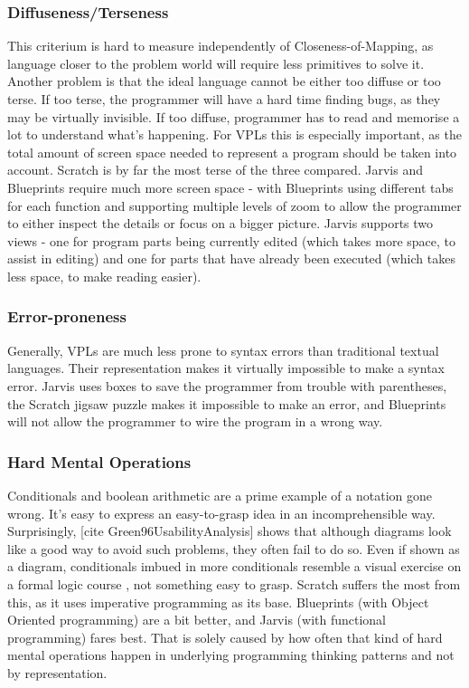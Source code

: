 \documentclass[11pt]{scrartcl}
\begin{document}
\subsubsection{Diffuseness/Terseness}
This criterium is hard to measure independently of Closeness-of-Mapping, as language closer to the problem world will require less primitives to solve it. Another problem is that the ideal language cannot be either too diffuse or too terse. If too terse, the programmer will have a hard time finding bugs, as they may be virtually invisible. If too diffuse, programmer has to read and memorise a lot to understand what’s happening. For VPLs this is especially important, as the total amount of screen space needed to represent a program should be taken into account. Scratch is by far the most terse of the three compared. Jarvis and Blueprints require much more screen space - with Blueprints using different tabs for each function and supporting multiple levels of zoom to allow the programmer to either inspect the details or focus on a bigger picture. Jarvis supports two views - one for program parts being currently edited (which takes more space, to assist in editing) and one for parts that have already been executed (which takes less space, to make reading easier).
\subsubsection{Error-proneness}
Generally, VPLs are much less prone to syntax errors than traditional textual languages. Their representation makes it virtually impossible to make a syntax error. Jarvis uses boxes to save the programmer from trouble with parentheses, the Scratch jigsaw puzzle makes it impossible to make an error, and Blueprints will not allow the programmer to wire the program in a wrong way.
\subsubsection{Hard Mental Operations}
Conditionals and boolean arithmetic are a prime example of a notation gone wrong. It’s easy to express an easy-to-grasp idea in an incomprehensible way. Surprisingly, [cite Green96UsabilityAnalysis] shows that although diagrams look like a good way to avoid such problems, they often fail to do so. Even if shown as a diagram, conditionals imbued in more conditionals resemble a visual exercise on a formal logic course , not something easy to grasp. Scratch suffers the most from this, as it uses imperative programming as its base. Blueprints (with Object Oriented programming) are a bit better, and Jarvis (with functional programming) fares best. That is solely caused by how often that kind of hard mental operations happen in underlying programming thinking patterns and not by representation.
\end{document}

